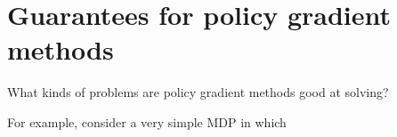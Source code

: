 \documentclass[\main/main]{subfiles}
\begin{document}
\section{Guarantees for policy gradient methods}

What kinds of problems are policy gradient methods good at solving?

For example, consider a very simple MDP in which
\end{document}

